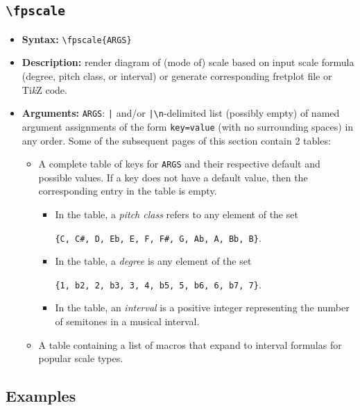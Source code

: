 \documentclass[12pt,letterpaper]{article}
\begin{document}
\subsection{\texttt{\textbackslash fpscale}}

\begin{itemize}
  \item[] \textbf{\color{blue} Syntax:} \texttt{\textbackslash fpscale\{ARGS\}}
  \item[] \textbf{\color{blue} Description:} render diagram of (mode of) scale based on input scale formula (degree, pitch class, or interval) or generate corresponding fretplot file or Ti\textit{k}Z code.
  \item[] \textbf{\color{blue} Arguments:} \texttt{ARGS}: \texttt{|} and/or \texttt{|\textbackslash n}-delimited list (possibly empty) of named argument assignments of the form \texttt{key=value} (with no surrounding spaces) in any order. Some of the subsequent pages of this section contain 2 tables:
    \begin{itemize}
    \item A complete table of keys for \texttt{ARGS} and their respective default and possible values. If a key does not have a default value, then the corresponding entry in the table is empty.
        \begin{itemize}
        \item In the table, a \textit{pitch class} refers to any element of the set
\begin{center}
\texttt{\{C, C\#, D, Eb, E, F, F\#, G, Ab, A, Bb, B\}}.
\end{center}
\item In the table, a \textit{degree} is any element of the set
\begin{center}
\texttt{\{1, b2, 2, b3, 3, 4, b5, 5, b6, 6, b7, 7\}}.
\end{center}
\item In the table, an \textit{interval} is a positive integer representing the number of semitones in a musical interval.
        \end{itemize}
    \item A table containing a list of macros that expand to interval formulas for popular scale types.
    \end{itemize}
\end{itemize}

\subsection{Examples}
\end{document}

